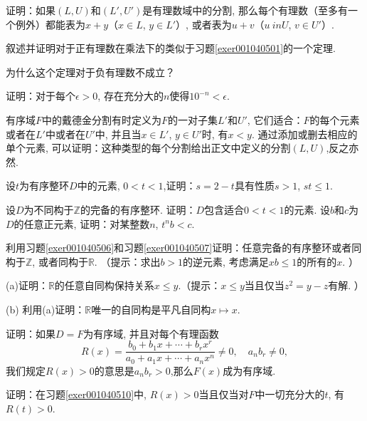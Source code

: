 \begin{problemset}
\item\label{exer001040501} 证明：如果$(L,U)$和$(L',U')$是有理数域中的分割, 那么每个有理数（至多有一个例外）都能表为$x+y$（$x \in L$, $y \in L'$）, 或者表为$u+v$（$u \ in U$, $v \in U'$）. 

\item 叙述并证明对于正有理数在乘法下的类似于习题\ref{exer001040501}的一个定理.  

\item 为什么这个定理对于负有理数不成立？

\item 证明：对于每个$\epsilon>0$, 存在充分大的$n$使得$10^{-n}<\epsilon$.

\item 有序域$F$中的戴德金分割有时定义为$F$的一对子集$L'$和$U'$, 它们适合：$F$的每个元素或者在$L'$中或者在$U'$中, 并且当$x \in L'$, $y \in U'$时, 有$x < y$. 通过添加或删去相应的单个元素, 可以证明：这种类型的每个分割给出正文中定义的分割$(L, U)$,反之亦然. 

\item\label{exer001040506} 设$t$为有序整环$D$中的元素, $0<t<1$,证明：$s=2-t$具有性质$s>1$, $st \le 1$.

\item\label{exer001040507} 设$D$为不同构于$\mathbb{Z}$的完备的有序整环. 证明：$D$包含适合$0<t<1$的元素. 设$b$和$c$为$D$的任意正元素, 证明：对某整数$n$, $t^nb<c$.

\item 利用习题\ref{exer001040506}和习题\ref{exer001040507}证明：任意完备的有序整环或者同构于$\mathbb{Z}$, 或者同构于$\mathbb{R}$. （提示：求出$b>1$的逆元素, 考虑满足$xb \le 1$的所有的$x$. ）

\item (a)证明：$\mathbb{R}$的任意自同构保持关系$x \le y$.（提示：$x \le y$当且仅当$z^2 = y-z$有解. ）

(b) 利用(a)证明：$\mathbb{R}$唯一的自同构是平凡自同构$x \mapsto x$.

\item\label{exer001040510} 证明：如果$D=F$为有序域, 并且对每个有理函数
\[
R(x) = \frac{b_0+b_1x + \cdots + b_rx^r}{a_0 + a_1x+\cdots+a_nx^n} \neq 0, \quad a_nb_r \neq 0,
\]
我们规定$R(x)>0$的意思是$a_nb_r>0$,那么$F(x)$成为有序域. 

\item 证明：在习题\ref{exer001040510}中, $R(x)>0$当且仅当对$F$中一切充分大的$t$, 有$R(t)>0$.
\end{problemset}



